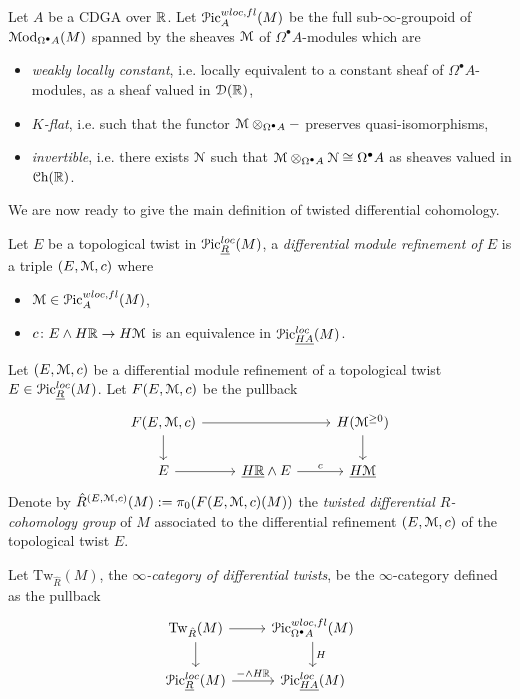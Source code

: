 \documentclass[10pt]{amsart}
\begin{document}
\begin{definition}
  Let $A$ be a CDGA over $\mathbb{R}$. Let $\mathcal{P}\mathrm{ic}^{wloc, fl}_A(M)$ be the full sub-$\infty$-groupoid of $\mathcal{M}\mathrm{od}_{\Omega^\bullet A}(M)$ spanned by the sheaves $\mathcal{M}$ of $\Omega^\bullet A$-modules which are
  \begin{itemize}
    \item \emph{weakly locally constant}, i.e. locally equivalent to a constant sheaf of $\Omega^\bullet A$-modules, as a sheaf valued in $\mathcal{D}(\mathbb{R})$,
    \item \emph{$K$-flat}, i.e. such that the functor $\mathcal{M} \otimes_{\Omega^\bullet A} -$ preserves quasi-isomorphisms,
    \item \emph{invertible}, i.e. there exists $\mathcal{N}$ such that $\mathcal{M} \otimes_{\Omega^\bullet A} \mathcal{N} \cong \Omega^\bullet A$ as sheaves valued in $\mathcal{C}\mathrm{h}(\mathbb{R})$.
  \end{itemize} 
\end{definition}

We are now ready to give the main definition of twisted differential cohomology.

\begin{definition}
  Let $E$ be a topological twist in $\mathcal{P}\mathrm{ic}^{loc}_{\underline{R}}(M)$, a \emph{differential module refinement of $E$} is a triple $(E, \mathcal{M}, c)$ where
  \begin{itemize}
    \item $\mathcal{M} \in \mathcal{P}\mathrm{ic}^{wloc, fl}_A(M)$,
    \item $c\colon E \wedge H\mathbb{R} \to H\mathcal{M}$ is an equivalence in $\mathcal{P}\mathrm{ic}^{loc}_{\underline{HA}}(M)$.
  \end{itemize}
\end{definition}

\begin{definition}
  Let $(E, \mathcal{M}, c)$ be a differential module refinement of a topological twist $E \in \mathcal{P}\mathrm{ic}^{loc}_{\underline{R}}(M)$. Let $F(E,\mathcal{M},c)$ be the pullback
  \[
  \begin{tikzcd}
    F(E,\lM,c) \arrow[rr] \arrow[d] & & H(\lM^{\geq 0}) \arrow[d] \\
    E \arrow[r] & \underline{H\bR} \wedge E \arrow[r, "c"] &  \underline{H\lM} 
  \end{tikzcd}
  \]
  Denote by $\hat{R}^{(E,\mathcal{M},c)}(M) := \pi_0(F(E,\mathcal{M},c)(M))$ the \emph{twisted differential $R$-cohomology group} of $M$ associated to the differential refinement $(E,\mathcal{M},c)$ of the topological twist $E$.
\end{definition}

\begin{definition}
  Let $\mathrm{Tw}_{\hat{R}}(M)$, the \emph{$\infty$-category of differential twists}, be the $\infty$-category defined as the pullback
  \[
  \begin{tikzcd}
    \mathrm{Tw}_{\hat{R}}(M) \arrow[r] \arrow[d] & \Pic^{wloc, fl}_{\Omega^\bullet A}(M) \arrow[d, "H"] \\
    \Pic^{loc}_{\underline{R}}(M) \arrow[r, " - \wedge H\bR"] & \Pic^{loc}_{\underline{HA}}(M)
  \end{tikzcd}
  \]
\end{definition}
\end{document}
